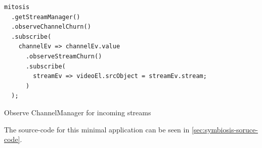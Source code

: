 \begin{Listing}
\begin{lstlisting}
mitosis
  .getStreamManager()
  .observeChannelChurn()
  .subscribe(
    channelEv => channelEv.value
      .observeStreamChurn()
      .subscribe(
        streamEv => videoEl.srcObject = streamEv.stream;
      )
  );
\end{lstlisting}
\caption{Observe ChannelManager for incoming streams}
\label{lst:symbiosis-observe-stream}
\end{Listing}

The source-code for this minimal application can be seen in \vref{sec:symbiosis-soruce-code}.

